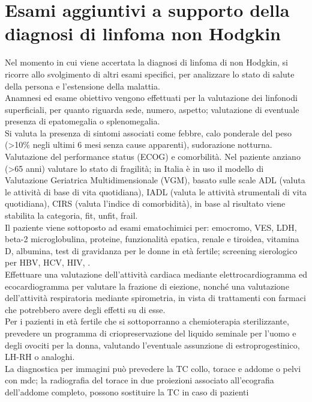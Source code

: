 \section{Esami aggiuntivi a supporto della diagnosi di linfoma non Hodgkin}
Nel momento in cui viene accertata la diagnosi di linfoma di non Hodgkin, si ricorre allo svolgimento di altri 
esami specifici, per analizzare lo stato di salute della persona e l’estensione della malattia.\\
Anamnesi ed esame obiettivo vengono effettuati per la valutazione dei linfonodi superficiali, per quanto riguarda sede, numero, aspetto; 
valutazione di eventuale presenza di epatomegalia o splenomegalia.\\
Si valuta la presenza di sintomi associati come febbre, calo ponderale del peso 
(>10\% negli ultimi 6 mesi senza cause apparenti), sudorazione notturna\cite{reteveneta}.\\
Valutazione del performance status (ECOG) e comorbilità. 
Nel paziente anziano (>65 anni) valutare lo stato di fragilità; in Italia è in uso il modello di 
Valutazione Geriatrica Multidimensionale (VGM), basato sulle scale ADL (valuta le attività di base di vita quotidiana),
 IADL (valuta le attività strumentali di vita quotidiana), CIRS (valuta l’indice di comorbidità), 
 in base al risultato viene stabilita la categoria, fit, unfit, frail\cite{reteveneta}.\\
 Il paziente viene sottoposto ad esami ematochimici per: emocromo, VES, LDH, beta-2 microglobulina, proteine, 
 funzionalità epatica, renale e tiroidea, vitamina D, albumina, test di gravidanza per le donne in età fertile; 
 screening sierologico per HBV, HCV, HIV\cite{AIOM}, \cite{reteveneta}.\\
Effettuare una valutazione dell’attività cardiaca mediante elettrocardiogramma ed ecocardiogramma per valutare 
la frazione di eiezione, nonché una valutazione dell’attività respiratoria mediante spirometria, in vista di 
trattamenti con farmaci che potrebbero avere degli effetti su di esse\cite{AIOM}.\\ 
Per i pazienti in età fertile che si sottoporranno a chemioterapia sterilizzante, prevedere un programma di 
criopreservazione del liquido seminale per l’uomo e degli ovociti per la donna, valutando l’eventuale assunzione di 
estroprogestinico, LH-RH o analoghi\cite{AIOM}.\\
La diagnostica per immagini può prevedere la TC collo, torace e addome o pelvi con mdc; la radiografia del torace 
in due proiezioni associato all’ecografia dell’addome completo, possono sostituire la TC in caso di pazienti 
